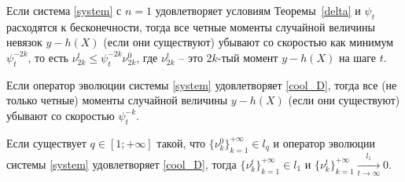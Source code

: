             \begin{lemma} \label{moments}
            Если система \eqref{system} с $n=1$ удовлетворяет условиям Теоремы~\ref{delta} и $\psi_t$ расходятся к бесконечности, тогда все четные моменты случайной величины невязок 
            $y - h(X)$ (если они существуют) убывают со скоростью как минимум $\psi_t^{-2k}$, то есть $\nu_{2k}^t \leq \psi_t^{-2k} \nu_{2k}^0$, где $\nu_{2k}^t$ -- это $2k$-тый момент $y - h(X)$ на шаге $t$.
    
            Если оператор эволюции системы \eqref{system} удовлетворяет \eqref{cool_D}, тогда все (не только четные) моменты случайной величины
            $y - h(X)$ (если они существуют) убывают со скоростью $\psi_t^{-k}$.
    
            Если существует $q \in [1; +\infty]$ такой, что $\{\nu_k^0\}_{k=1}^{+\infty} \in l_q$ и оператор эволюции системы \eqref{system} удовлетворяет \eqref{cool_D}, тогда $\{\nu_k^t\}_{k=1}^{+\infty} \in l_1$ и $\{\nu_k^t\}_{k=1}^{+\infty} \underset{t \to \infty}{\overset{l_1}{\longrightarrow}} 0$.
        \end{lemma}

